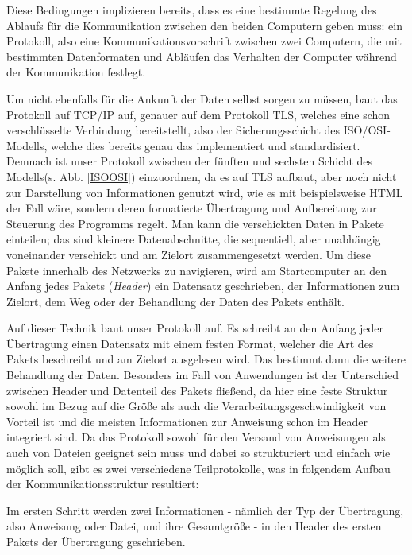 Diese Bedingungen implizieren bereits, dass es eine bestimmte Regelung des Ablaufs für die Kommunikation zwischen den beiden Computern geben muss: ein Protokoll, also eine Kommunikationsvorschrift zwischen zwei Computern, die mit bestimmten Datenformaten und Abläufen das Verhalten der Computer während der Kommunikation festlegt.\par
Um nicht ebenfalls für die Ankunft der Daten selbst sorgen zu müssen, baut das Protokoll auf TCP/IP auf, genauer auf dem Protokoll TLS, welches eine schon verschlüsselte Verbindung bereitstellt, also der Sicherungsschicht des ISO/OSI-Modells, welche dies bereits genau das implementiert und standardisiert. Demnach ist unser Protokoll zwischen der fünften und sechsten Schicht des Modells(s. Abb. \ref{ISOOSI}) einzuordnen, da es auf TLS aufbaut, aber noch nicht zur Darstellung von Informationen genutzt wird, wie es mit beispielsweise HTML der Fall wäre, sondern deren formatierte Übertragung und Aufbereitung zur Steuerung des Programms regelt.
Man kann die verschickten Daten in Pakete einteilen; das sind kleinere Datenabschnitte, die sequentiell, aber unabhängig voneinander verschickt und am Zielort zusammengesetzt werden.
Um diese Pakete innerhalb des Netzwerks zu navigieren, wird am Startcomputer an den Anfang jedes Pakets (\textit{Header}) ein Datensatz geschrieben, der Informationen zum Zielort, dem Weg oder der Behandlung der Daten des Pakets enthält.\\\par
Auf dieser Technik baut unser Protokoll auf. Es schreibt an den Anfang jeder Übertragung einen Datensatz mit einem festen Format, welcher die Art des Pakets beschreibt und am Zielort ausgelesen wird. Das bestimmt dann die weitere Behandlung der Daten.
Besonders im Fall von Anwendungen ist der Unterschied zwischen Header und Datenteil des Pakets fließend, da hier eine feste Struktur sowohl im Bezug auf die Größe als auch die Verarbeitungsgeschwindigkeit von Vorteil ist und die meisten Informationen zur Anweisung schon im Header integriert sind.
Da das Protokoll sowohl für den Versand von Anweisungen als auch von Dateien geeignet sein muss und dabei so strukturiert und einfach wie möglich soll, gibt es zwei verschiedene Teilprotokolle, was in folgendem Aufbau der Kommunikationsstruktur resultiert:\par
Im ersten Schritt werden zwei Informationen - nämlich der Typ der Übertragung, also Anweisung oder Datei, und ihre Gesamtgröße - in den Header des ersten Pakets der Übertragung geschrieben.\\
